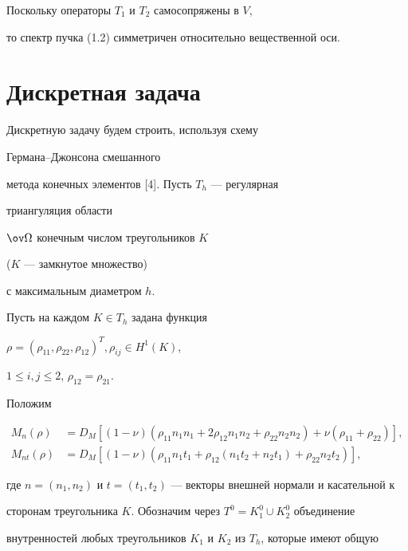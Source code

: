 \begin{notes} Поскольку операторы $T_1$ и $T_2$ самосопряжены в $V$,


то спектр пучка (1.2) симметричен относительно вещественной оси.


\end{notes}





\section{Дискретная задача} 





Дискретную задачу будем строить, используя схему


Германа--Джонсона смешанного


метода конечных элементов [4]. Пусть $T_h$ --- регулярная 


триангуляция области


$\ov \Omega$ конечным числом треугольников $K$


($K$ --- замкнутое множество)


с максимальным диаметром $h$.


Пусть на каждом $K\in T_h$ задана функция


$\rho=(\rho_{11},\rho_{22},\rho_{12})^T,\rho_{ij}\in H^1(K)$,


$1\le i,j\le 2$, $\rho_{12}=\rho_{21}.$


Положим


\begin{align*}


M_n(\rho)&=D_M[(1-\nu)(\rho_{11}n_1 n_1+2\rho_{12}n_1 n_2+\rho_{22}n_2 n_2)


+\nu (\rho_{11}+\rho_{22})],\\


%


M_{nt}(\rho)&=D_M[(1-\nu)(\rho_{11}n_1 t_1+\rho_{12}(n_1 t_2+n_2 t_1)+


\rho_{22}n_2 t_2)],


\end{align*}


где $n=(n_1,n_2)$ и $t=(t_1,t_2)$ --- векторы внешней нормали и касательной к


сторонам треугольника $K$. Обозначим через $T^0=K_1^0\cup K_2^0$ объединение


внутренностей любых треугольников $K_1$ и $K_2$ из $T_h$, которые имеют общую



